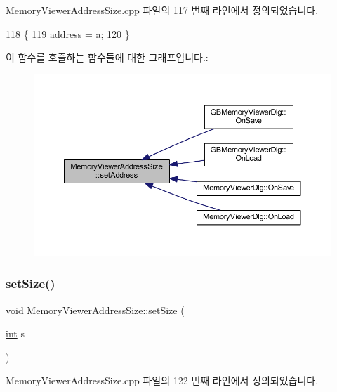 Memory\+Viewer\+Address\+Size.\+cpp 파일의 117 번째 라인에서 정의되었습니다.


\begin{DoxyCode}
118 \{
119   address = a;
120 \}
\end{DoxyCode}
이 함수를 호출하는 함수들에 대한 그래프입니다.\+:
\nopagebreak
\begin{figure}[H]
\begin{center}
\leavevmode
\includegraphics[width=350pt]{class_memory_viewer_address_size_adb284f02039e70a6b0c44e0bacf9feff_icgraph}
\end{center}
\end{figure}
\mbox{\label{class_memory_viewer_address_size_a20e77ae46d654fc217b381d6d8aac00d}} 
\subsubsection{\texorpdfstring{set\+Size()}{setSize()}}
{\footnotesize\ttfamily void Memory\+Viewer\+Address\+Size\+::set\+Size (\begin{DoxyParamCaption}\item[{\mbox{\hyperlink{_util_8cpp_a0ef32aa8672df19503a49fab2d0c8071}{int}}}]{s }\end{DoxyParamCaption})}



Memory\+Viewer\+Address\+Size.\+cpp 파일의 122 번째 라인에서 정의되었습니다.


